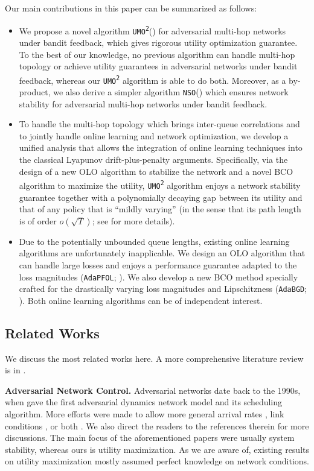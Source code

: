 \documentclass[11pt,fullpage,letterpaper]{article} %
\newcommand{\SSAlg}{\texttt{NSO}\xspace}
\newcommand{\UMAlg}{\texttt{UMO}\textsuperscript{\texttt{2}}\xspace}
\newcommand{\OLOAlg}{\texttt{AdaPFOL}\xspace}
\newcommand{\BCOAlg}{\texttt{AdaBGD}\xspace}
\begin{document}
Our main contributions in this paper can be summarized as follows:
\begin{itemize}
\item We propose a novel algorithm \UMAlg () for adversarial multi-hop networks under bandit feedback, which gives rigorous utility optimization guarantee. To the best of our knowledge, no previous algorithm can handle multi-hop topology or achieve utility guarantees in adversarial networks under bandit feedback, whereas our \UMAlg algorithm is able to do both.
Moreover, as a by-product, we also derive a simpler algorithm \SSAlg () which ensures network stability for adversarial multi-hop networks under bandit feedback.
\item To handle the multi-hop topology which brings inter-queue correlations and to jointly handle online learning and network optimization, 
we develop a unified analysis that allows the integration of online learning techniques into the classical Lyapunov drift-plus-penalty arguments. 
Specifically, via the design of a new OLO algorithm to stabilize the network and a novel BCO algorithm to maximize the utility, \UMAlg algorithm enjoys a network stability guarantee together with a polynomially decaying gap between its utility and that of any policy that is ``mildly varying''
(in the sense that its path length is of order $o(\sqrt T)$; see  for more details).
\item Due to the potentially unbounded queue lengths, existing online learning algorithms are unfortunately inapplicable. We design an OLO algorithm that can handle large losses and enjoys a performance guarantee adapted to the loss magnitudes (\OLOAlg; ). We also develop a new BCO method specially crafted for the drastically varying loss magnitudes and Lipschitzness (\BCOAlg; ). Both online learning algorithms can be of independent interest.
\end{itemize}

\subsection{Related Works}\label{sec:related work}
We discuss the most related works here. A more comprehensive literature review is in .

\textbf{Adversarial Network Control.}
Adversarial networks date back to the 1990s, when \citet{cruz1991calculus} gave the first adversarial dynamics network model and its scheduling algorithm. More efforts were made to allow more general arrival rates \citep{borodin2001adversarial,andrews2001universal}, link conditions \citep{andrews2004scheduling,andrews2007stability}, or both \citep{liang2018minimizing}. We also direct the readers to the references therein for more discussions.
The main focus of the aforementioned papers were usually system stability, whereas ours is utility maximization. As we are aware of, existing results on utility maximization \citep{neely2010universal,liang2018network} mostly assumed perfect knowledge on network conditions.
\end{document}
